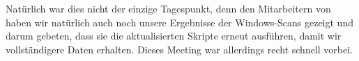 Natürlich war dies nicht der einzige Tagespunkt, denn den Mitarbeitern von {\aeclientZEZESE} haben wir natürlich auch noch unsere Ergebnisse der Windows-Scans gezeigt und darum gebeten, dass sie die aktualisierten Skripte erneut ausführen, damit wir vollständigere Daten erhalten.
Dieses Meeting war allerdings recht schnell vorbei.
